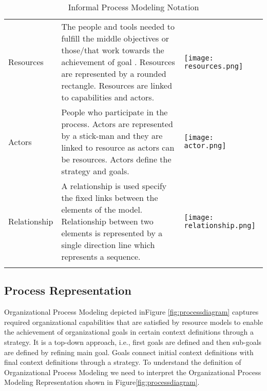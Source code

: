 \begin{center}
\begin{longtable}{p{3cm}p{10cm}p{3cm}}
		Resources					& The people and tools needed to fulfill the middle objectives or those/that work towards the achievement of goal . Resources are represented by a rounded rectangle. Resources are linked to capabilities and actors. & \begin{center} \texttt{[image: resources.png]} \end{center}   \\
		
		Actors					& People who participate in the process. Actors are represented by a stick-man and they are linked to resource as actors can be resources. Actors define the strategy and goals.  & \begin{center} \texttt{[image: actor.png]} \end{center}   \\
		
		Relationship				& A relationship is used specify the fixed links between the elements of the model. Relationship between two elements is represented by a single direction line which represents a sequence.  & \begin{center} \texttt{[image: relationship.png]} \end{center}   \\
		
		
		\bottomrule
		\caption{Informal Process Modeling Notation}
		\label{tab:notations}		
	\end{longtable}	
\end{center}



\subsection{Process Representation}
Organizational Process Modeling depicted inFigure \ref{fig:processdiagram} captures required organizational capabilities that are satisfied by resource models  to enable the achievement of organizational goals in certain context definitions through a strategy. It is a top-down approach, i.e., first goals are defined and then sub-goals  are defined by refining main goal. Goals connect initial context definitions with final context definitions through a strategy.  To understand the definition of Organizational Process Modeling we need to interpret the Organizational Process Modeling Representation shown in Figure\ref{fig:processdiagram}. 

